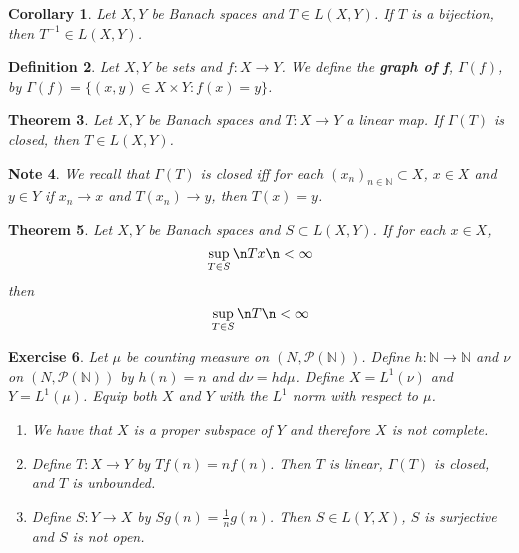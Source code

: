 \documentclass[12pt]{amsart}
\newtheorem{thm}{Theorem}[subsection]
\newtheorem{cor}[thm]{Corollary}
\newtheorem{defn}[thm]{Definition}
\newtheorem{note}[thm]{Note}
\newtheorem{ex}[thm]{Exercise}
\newcommand{\Gam}{\Gamma}
\newcommand{\N}{\mathbb{N}}
\newcommand{\MP}{\mathcal{P}}
\newcommand{\conv}[1]{\xrightarrow{#1}}
\begin{document}
\begin{cor}
	Let $X, Y$ be Banach spaces and $T \in L(X,Y)$. If $T$ is a bijection, then $T^{-1} \in L(X,Y)$.
\end{cor}

\begin{defn}
	Let $X,Y$ be sets and $f:X \rightarrow Y$. We define the \textbf{graph of f}, $\Gam(f)$, by $\Gam(f) = \{(x,y) \in X \times Y: f(x) = y\}$.
\end{defn}

\begin{thm}
	Let $X, Y$ be Banach spaces and $T:X \rightarrow Y$ a linear map. If $\Gam(T)$ is closed, then $T \in L(X,Y)$.  
\end{thm}

\begin{note}
	We recall that $\Gam(T)$ is closed iff for each $(x_n)_{n \in \N} \subset X$, $x \in X$ and $y \in Y$ if $x_n \conv{} x$ and $T(x_n) \conv{} y$, then $T(x) = y$. 
\end{note}

\begin{thm}
	
	Let $X, Y$ be Banach spaces and $S \subset L(X,Y)$. If for each $x \in X$, $$\sup_{T \in S} \n Tx \n < \infty$$ then $$\sup_{T \in S} \n T \n < \infty$$
\end{thm}

\begin{ex}
	Let $\mu$ be counting measure on $(N, \MP(\N))$. Define $h: \N \rightarrow \N$ and $ \nu$ on $(N, \MP(\N))$ by $h(n) = n$ and $d \nu = h d \mu$. Define $X=L^1(\nu)$ and $Y = L^1(\mu)$. Equip both $X$ and $Y$ with the $L^1$ norm with respect to $\mu$. 
	\begin{enumerate}
		\item We have that $X$ is a proper subspace of $Y$ and therefore $X$ is not complete.
		\item Define $T: X \rightarrow Y$ by $Tf(n) = nf(n)$. Then $T$ is linear, $\Gam(T)$ is closed, and $T$ is unbounded.
		\item Define $S:Y \rightarrow X$ by $Sg(n) = \frac{1}{n}g(n)$. Then $S \in L(Y,X)$, $S$ is surjective and $S$ is not open. 
	\end{enumerate}
\end{ex}
\end{document}

